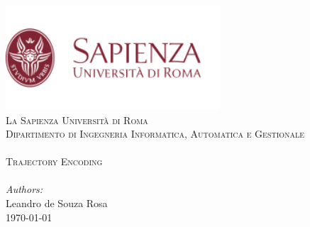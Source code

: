 \begin{titlepage}

\center 
 
\includegraphics[width=0.6\textwidth]{images/logo.png}\\[1cm] 	
\textsc{\LARGE La Sapienza Università di Roma}\\[1cm]

\textsc{\Large Dipartimento di Ingegneria Informatica, Automatica e Gestionale}\\[0.2cm]
\vfill
\HRule \\[0.8cm]					%
\textsc{\Huge Trajectory Encoding}\\[1cm]%
\HRule \\[2cm]
\large
\emph{Authors:}\\
Leandro de Souza Rosa \\[1.5cm]													%
{\large \today}\\[5cm]

\vfill 
\end{titlepage}
